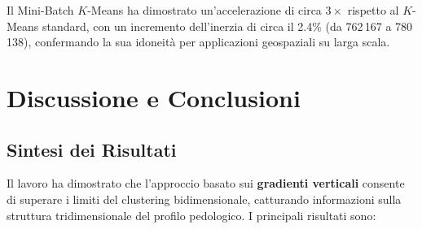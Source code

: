 \documentclass[a4paper,12pt]{article}
\newcommand{\kmeans}{$K$\nobreakdash-Means}
\begin{document}
Il Mini-Batch \kmeans{} ha dimostrato un'accelerazione di circa $3\times$
rispetto al \kmeans{} standard, con un incremento dell'inerzia
di circa il 2.4\% (da 762\,167 a 780\,138), confermando la sua idoneità
per applicazioni geospaziali su larga scala.


\section{Discussione e Conclusioni}
\label{sec:conclusioni}

\subsection{Sintesi dei Risultati}

Il lavoro ha dimostrato che l'approccio basato sui \textbf{gradienti
verticali} consente di superare i limiti del clustering bidimensionale,
catturando informazioni sulla struttura tridimensionale del profilo
pedologico. I principali risultati sono:
\end{document}
